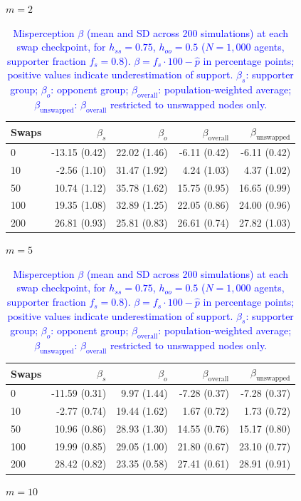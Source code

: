 \begin{table}[H]
\centering
\caption{\textcolor{blue}{Misperception $\beta$ (mean and SD across 200 simulations) at each swap checkpoint, for $h_{ss} = 0.75$, $h_{oo} = 0.5$ ($N = 1{,}000$ agents, supporter fraction $f_s = 0.8$). $\beta = f_s \cdot 100 - \hat{p}$ in percentage points; positive values indicate underestimation of support. $\beta_s$: supporter group; $\beta_o$: opponent group; $\beta_{\mathrm{overall}}$: population-weighted average; $\beta_{\mathrm{unswapped}}$: $\beta_{\mathrm{overall}}$ restricted to unswapped nodes only.}}
\label{tab:subset_fs08_hss750_hoo500}
\par\medskip
\noindent\textit{$m = 2$}\\[2pt]
\begin{tabular}{l rrrr}
\toprule
Swaps & $\beta_s$ & $\beta_o$ & $\beta_{\mathrm{overall}}$ & $\beta_{\mathrm{unswapped}}$ \\
\midrule
0 & -13.15 (0.42) & 22.02 (1.46) & -6.11 (0.42) & -6.11 (0.42) \\
10 & -2.56 (1.10) & 31.47 (1.92) & 4.24 (1.03) & 4.37 (1.02) \\
50 & 10.74 (1.12) & 35.78 (1.62) & 15.75 (0.95) & 16.65 (0.99) \\
100 & 19.35 (1.08) & 32.89 (1.25) & 22.05 (0.86) & 24.00 (0.96) \\
200 & 26.81 (0.93) & 25.81 (0.83) & 26.61 (0.74) & 27.82 (1.03) \\
\bottomrule
\end{tabular}
\par\medskip
\noindent\textit{$m = 5$}\\[2pt]
\begin{tabular}{l rrrr}
\toprule
Swaps & $\beta_s$ & $\beta_o$ & $\beta_{\mathrm{overall}}$ & $\beta_{\mathrm{unswapped}}$ \\
\midrule
0 & -11.59 (0.31) & 9.97 (1.44) & -7.28 (0.37) & -7.28 (0.37) \\
10 & -2.77 (0.74) & 19.44 (1.62) & 1.67 (0.72) & 1.73 (0.72) \\
50 & 10.96 (0.86) & 28.93 (1.30) & 14.55 (0.76) & 15.17 (0.80) \\
100 & 19.99 (0.85) & 29.05 (1.00) & 21.80 (0.67) & 23.10 (0.77) \\
200 & 28.42 (0.82) & 23.35 (0.58) & 27.41 (0.61) & 28.91 (0.91) \\
\bottomrule
\end{tabular}
\par\medskip
\noindent\textit{$m = 10$}\\[2pt]

\end{table}
